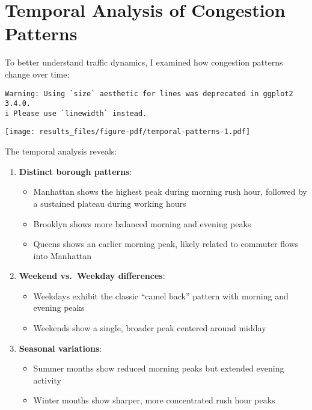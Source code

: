 \documentclass[
  letterpaper,
  DIV=11,
  numbers=noendperiod]{scrreprt}
\providecommand{\tightlist}{%
  \setlength{\itemsep}{0pt}\setlength{\parskip}{0pt}}\usepackage{longtable,booktabs,array}
\begin{document}
\section{Temporal Analysis of Congestion
Patterns}\label{temporal-analysis-of-congestion-patterns}

To better understand traffic dynamics, I examined how congestion
patterns change over time:

\begin{verbatim}
Warning: Using `size` aesthetic for lines was deprecated in ggplot2 3.4.0.
i Please use `linewidth` instead.
\end{verbatim}

\texttt{[image: results\_files/figure-pdf/temporal-patterns-1.pdf]}

The temporal analysis reveals:

\begin{enumerate}
\def\labelenumi{\arabic{enumi}.}
\tightlist
\item
  \textbf{Distinct borough patterns}:

  \begin{itemize}
  \tightlist
  \item
    Manhattan shows the highest peak during morning rush hour, followed
    by a sustained plateau during working hours
  \item
    Brooklyn shows more balanced morning and evening peaks
  \item
    Queens shows an earlier morning peak, likely related to commuter
    flows into Manhattan
  \end{itemize}
\item
  \textbf{Weekend vs.~Weekday differences}:

  \begin{itemize}
  \tightlist
  \item
    Weekdays exhibit the classic ``camel back'' pattern with morning and
    evening peaks
  \item
    Weekends show a single, broader peak centered around midday
  \end{itemize}
\item
  \textbf{Seasonal variations}:

  \begin{itemize}
  \tightlist
  \item
    Summer months show reduced morning peaks but extended evening
    activity
  \item
    Winter months show sharper, more concentrated rush hour peaks
  \end{itemize}
\end{enumerate}
\end{document}
